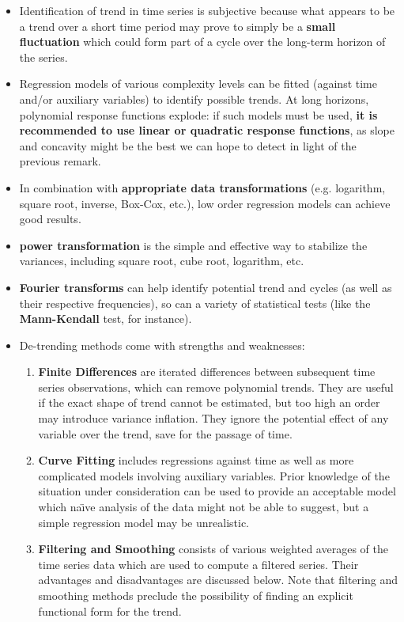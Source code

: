 \begin{itemize}[noitemsep]
\item Identification of trend in time series is subjective because what appears to be a trend over a short time period may prove to simply be a \textbf{small fluctuation} which could form part of a cycle over the long-term horizon of the series. 
\item Regression models of various complexity levels can be fitted (against time and/or auxiliary variables) to identify possible trends. At long horizons, polynomial response functions explode: if such models must be used, \textbf{it is recommended to use linear or quadratic response functions}, as slope and concavity might be the best we can hope to detect in light of the previous remark. 
\item In combination with \textbf{appropriate data transformations} (e.g. logarithm, square root, inverse, Box-Cox, etc.), low order regression models can achieve good results. 
\item \textbf{power transformation} is the simple and effective way to stabilize the variances, including square root, cube root, logarithm, etc.
\item \textbf{Fourier transforms} can help identify potential trend and cycles (as well as their respective frequencies), so can a variety of statistical tests (like the \textbf{Mann-Kendall} test, for instance). 
\item De-trending methods come with strengths and weaknesses:
\begin{enumerate}
\item \textbf{Finite Differences} are iterated differences between subsequent time series observations, which can remove polynomial trends. They are useful if the exact shape of trend cannot be estimated, but too high an order may introduce variance inflation. They ignore the potential effect of any variable over the trend, save for the passage of time.
\item \textbf{Curve Fitting} includes regressions against time as well as more complicated models involving auxiliary variables. Prior knowledge of the situation under consideration can be used to provide an acceptable model which na\"{\i}ve analysis of the data might not be able to suggest,  but a  simple regression model may be unrealistic. 
\item \textbf{Filtering and Smoothing} consists of various weighted averages of the time series data which are used to compute a filtered series. Their advantages and disadvantages are discussed below. Note that filtering and smoothing methods preclude the possibility of finding an explicit functional form for the trend.

\end{enumerate}
\end{itemize}
